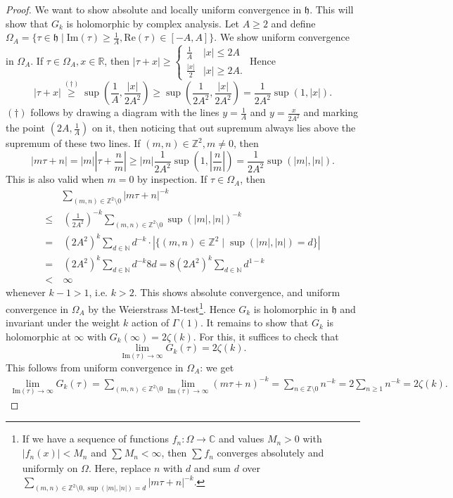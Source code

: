 \documentclass{article}
\theoremstyle{definition}
\begin{document}
\begin{proof}
    We want to show absolute and locally uniform convergence in $\mathfrak{h}$. This will show that $G_k$ is holomorphic by complex analysis. Let $A\ge 2$ and define $\Omega_A = \{\tau \in \mathfrak{h} \mid \text{Im}(\tau) \ge \frac{1}{A}, \text{Re}(\tau) \in [-A,A]\}$. We show uniform convergence in $\Omega_A$. If $\tau \in \Omega_A, x \in \mathbb{R}$, then $|\tau+x| \ge \begin{cases}
        \frac{1}{A} & |x|\le 2A\\
        \frac{|x|}{2} & |x|\ge 2A.
    \end{cases}$ 
    Hence $$|\tau + x| \stackrel{(\dagger)}{\ge} \sup\left(\frac{1}{A},\frac{|x|}{2A^2}\right) \ge \sup\left(\frac{1}{2A^2}, \frac{|x|}{2A^2}\right) = \frac{1}{2A^2}\sup(1,|x|).$$
    $(\dagger)$ follows by drawing a diagram with the lines $y=\frac{1}{A}$ and $y = \frac{x}{2A^2}$ and marking the point $(2A,\frac{1}{A})$ on it, then noticing that out supremum always lies above the supremum of these two lines. If $(m,n) \in \mathbb{Z}^2, m \neq 0$, then $$|m \tau + n| = |m| \left|\tau + \frac{n}{m}\right| \ge |m| \frac{1}{2A^2} \sup\left(1, \left|\frac{n}{m}\right|\right) = \frac{1}{2A^2}\sup\left(|m|, |n|\right).$$ This is also valid when $m=0$ by inspection. If $\tau \in \Omega_A$, then 
    \begin{align*}
        &\sum_{(m,n) \in \mathbb{Z}^2 \setminus  0}^{} |m \tau + n|^{-k} \\\le&~ \left(\frac{1}{2A^2}\right)^{-k}\sum_{(m,n) \in \mathbb{Z}^2 \setminus  0}^{} \sup\left(|m|, |n|\right)^{-k} \\=&~ (2A^2)^k \sum_{d \in \mathbb{N}}^{} d^{-k} \cdot \left|\{(m,n) \in \mathbb{Z}^2 \mid \sup\left(|m|, |n|\right) = d\}\right| \\=&~ (2A^2)^k \sum_{d \in \mathbb{N}}^{} d^{-k}8d = 8(2A^2)^k \sum_{d \in \mathbb{N}}^{} d^{1-k} \\<&~ \infty
    \end{align*}
    whenever $k-1>1$, i.e. $k>2$. This shows absolute convergence, and uniform convergence in $\Omega_A$ by the Weierstrass M-test\footnote{If we have a sequence of functions $f_n : \Omega \to \mathbb{C}$ and values $M_n>0$ with $|f_n(x)|<M_n$ and $\sum_{}^{} M_n < \infty$, then $\sum_{}^{} f_n$ converges absolutely and uniformly on $\Omega$. Here, replace $n$ with $d$ and sum $d$ over $\sum_{(m,n)\in\mathbb{Z}^2\setminus 0, \sup(|m|,|n|)=d}^{} |m \tau + n|^{-k}$.}. Hence $G_k$ is holomorphic in $\mathfrak{h}$ and invariant under the weight $k$ action of $\Gamma(1)$. It remains to show that $G_k$ is holomorphic at $\infty$ with $G_k(\infty) = 2\zeta(k)$. For this, it suffices to check that \[
    \lim_{\text{Im}(\tau) \to \infty} G_k(\tau) = 2\zeta(k).
    \]
    This follows from uniform convergence in $\Omega_A$: we get 
    \begin{align*}
        \lim_{\text{Im}(\tau) \to \infty} G_k(\tau) = \sum_{(m,n) \in \mathbb{Z}^2 \setminus  0}^{} \lim_{\text{Im}(\tau) \to \infty} (m \tau + n)^{-k} = \sum_{n \in \mathbb{Z} \setminus  0}^{} n^{-k} = 2 \sum_{n\ge 1}^{} n^{-k} = 2\zeta(k).
    \end{align*}
\end{proof}
\end{document}

